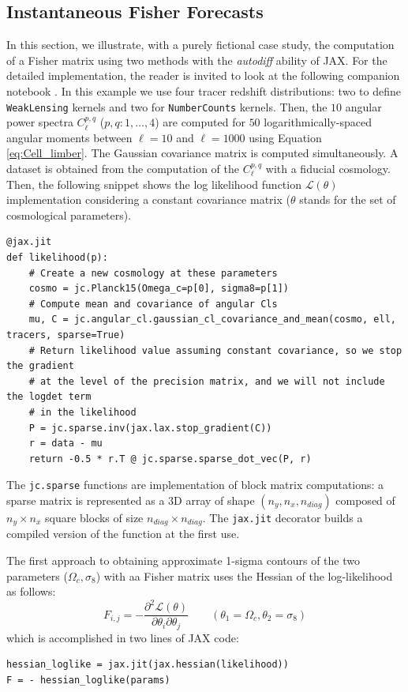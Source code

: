 \documentclass[twocolumn,twocolappendix,nofootinbib,iop]{openjournal}
\newcommand{\nblink}[1]{\href{https://github.com/DifferentiableUniverseInitiative/jax-cosmo-paper/blob/master/notebooks/#1.ipynb}{\faFileCodeO}}
\begin{document}
\subsection{Instantaneous Fisher Forecasts}
In this section, we illustrate, with a purely fictional case study, the computation of a Fisher matrix \citep{1997ApJ...480...22T,Stuart1991} using two methods with the \textit{autodiff} ability of JAX. For the detailed implementation, the reader is invited to look at the following companion notebook \nblink{Simple-Fisher}. In this example we use four tracer redshift distributions: two to define \texttt{WeakLensing} kernels and two for \texttt{NumberCounts} kernels. Then, the $10$ angular power spectra $C_\ell^{p,q}$ ($p,q:1,\dots,4$) are computed for $50$  logarithmically-spaced angular moments between $\ell=10$ and $\ell=1000$ using Equation \ref{eq:Cell_limber}. The Gaussian covariance matrix is computed simultaneously. A dataset is obtained from the computation of the $C_\ell^{p,q}$ with a fiducial cosmology. Then, the following snippet shows the log likelihood function $\mathcal{L}(\theta)$ implementation considering a constant covariance matrix ($\theta$ stands for the set of cosmological parameters). 
\begin{lstlisting}[language=iPython]
@jax.jit
def likelihood(p):
    # Create a new cosmology at these parameters
    cosmo = jc.Planck15(Omega_c=p[0], sigma8=p[1])
    # Compute mean and covariance of angular Cls
    mu, C = jc.angular_cl.gaussian_cl_covariance_and_mean(cosmo, ell, tracers, sparse=True)
    # Return likelihood value assuming constant covariance, so we stop the gradient
    # at the level of the precision matrix, and we will not include the logdet term
    # in the likelihood
    P = jc.sparse.inv(jax.lax.stop_gradient(C))
    r = data - mu
    return -0.5 * r.T @ jc.sparse.sparse_dot_vec(P, r)
\end{lstlisting}
The \texttt{jc.sparse} functions are implementation of block matrix computations: a sparse matrix is represented as a 3D array of shape $(n_y, n_x, n_{diag})$ composed of $n_y \times n_x$ square blocks of size $n_{diag} \times n_{diag}$.  The \texttt{jax.jit} decorator builds a compiled version of the function at the first use. 

The first approach to obtaining approximate 1-sigma contours of the two parameters ($\Omega_c, \sigma_8$) with aa Fisher matrix uses the Hessian of the log-likelihood as follows:
\begin{equation}
F_{i,j} = - \frac{\partial^2\mathcal{L}(\theta)}{\partial \theta_i \partial \theta_j}
\qquad (\theta_1=\Omega_c, \theta_2=\sigma_8)
\label{eq:fisher_way1}
\end{equation}
which is accomplished in two lines of JAX code:
\begin{lstlisting}[language=iPython]
hessian_loglike = jax.jit(jax.hessian(likelihood))
F = - hessian_loglike(params)
\end{lstlisting}
\end{document}
